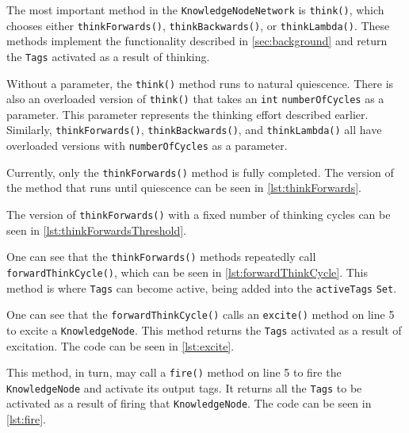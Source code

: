 \documentclass[titlepage,11pt]{article}
\def \knnpath {"/Users/seanstappas1/GitHub/prometheus-ai/knn/KnowledgeNodeNetwork.java"}
\newcommand{\ar}[1]{\autoref{#1}}
\newcommand{\code}[1]{\texttt{#1}}
\begin{document}
The most important method in the \code{KnowledgeNodeNetwork} is \code{think()}, which chooses either \code{thinkForwards()}, \code{thinkBackwards()}, or \code{thinkLambda()}. These methods implement the functionality described in \ar{sec:background} and return the \code{Tags} activated as a result of thinking.

Without a parameter, the \code{think()} method runs to natural quiescence. There is also an overloaded version of \code{think()} that takes an \code{int} \code{numberOfCycles} as a parameter. This parameter represents the thinking effort described earlier. Similarly, \code{thinkForwards()}, \code{thinkBackwards()}, and \code{thinkLambda()} all have overloaded versions with \code{numberOfCycles} as a parameter.

Currently, only the \code{thinkForwards()} method is fully completed. The version of the method that runs until quiescence can be seen in \autoref{lst:thinkForwards}.



The version of \code{thinkForwards()} with a fixed number of thinking cycles can be seen in \autoref{lst:thinkForwardsThreshold}.



One can see that the \code{thinkForwards()} methods repeatedly call \code{forwardThinkCycle()}, which can be seen in \autoref{lst:forwardThinkCycle}. This method is where \code{Tags} can become active, being added into the \code{activeTags} \code{Set}.



One can see that the \code{forwardThinkCycle()} calls an \code{excite()} method on line 5 to excite a \code{KnowledgeNode}. This method returns the \code{Tags} activated as a result of excitation. The code can be seen in \autoref{lst:excite}.



This method, in turn, may call a \code{fire()} method on line 5 to fire the \code{KnowledgeNode} and activate its output tags. It returns all the \code{Tags} to be activated as a result of firing that \code{KnowledgeNode}. The code can be seen in \autoref{lst:fire}.
\end{document}
